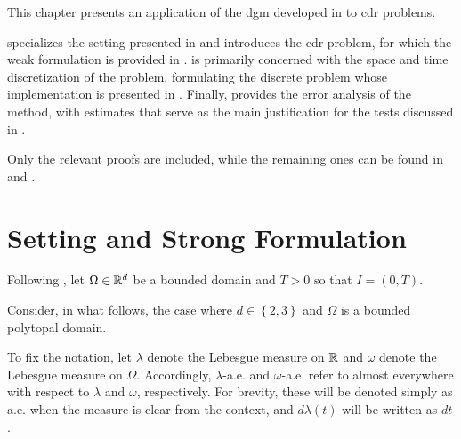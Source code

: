 This chapter presents an application of the \acrshort{dgm} developed in  to \acrshort{cdr} problems.

 specializes the setting presented in  and introduces the \acrshort{cdr} problem, for which the weak formulation is provided in .  is primarily concerned with the space and time discretization of the problem, formulating the discrete problem whose implementation is presented in . Finally,  provides the error analysis of the method, with estimates that serve as the main justification for the tests discussed in .

Only the relevant proofs are included, while the remaining ones can be found in  and .

\newpage
\section{Setting and Strong Formulation} \label{sec:cdr_introduction}

Following \cite{Feistauer2004}, let $\Omega \in \mathbb{R}^{d}$ be a bounded domain and $T > 0$ so that $I = \left( 0, T\right)$.

Consider, in what follows, the case where $d \in \left\{ 2, 3 \right\}$ and $\Omega$ is a bounded polytopal domain.

To fix the notation, let $\lambda$ denote the Lebesgue measure on $\mathbb{R}$ and $\omega$ denote the Lebesgue measure on $\Omega$. Accordingly, $\lambda$-a.e. and $\omega$-a.e. refer to almost everywhere with respect to $\lambda$ and $\omega$, respectively. For brevity, these will be denoted simply as a.e. when the measure is clear from the context, and $d\lambda(t)$ will be written as $dt$.

